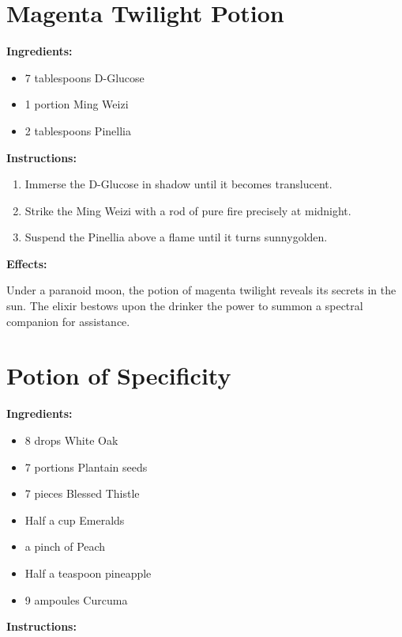 \documentclass{article}
\begin{document}
\newpage
\section*{Magenta Twilight Potion}

\textbf{Ingredients:}

\begin{itemize}
  \item 7 tablespoons D-Glucose
  \item 1 portion Ming Weizi
  \item 2 tablespoons Pinellia
\end{itemize}

\textbf{Instructions:}

\begin{enumerate}
  \item Immerse the D-Glucose in shadow until it becomes translucent.
  \item Strike the Ming Weizi with a rod of pure fire precisely at midnight.
  \item Suspend the Pinellia above a flame until it turns sunnygolden.
\end{enumerate}

\textbf{Effects:}

Under a paranoid moon, the potion of magenta twilight reveals its secrets in the sun. The elixir bestows upon the drinker the power to summon a spectral companion for assistance.

\newpage
\section*{Potion of Specificity}

\textbf{Ingredients:}

\begin{itemize}
  \item 8 drops White Oak
  \item 7 portions Plantain seeds
  \item 7 pieces Blessed Thistle
  \item Half a cup Emeralds
  \item a pinch of Peach
  \item Half a teaspoon pineapple
  \item 9 ampoules Curcuma
\end{itemize}

\textbf{Instructions:}
\end{document}
